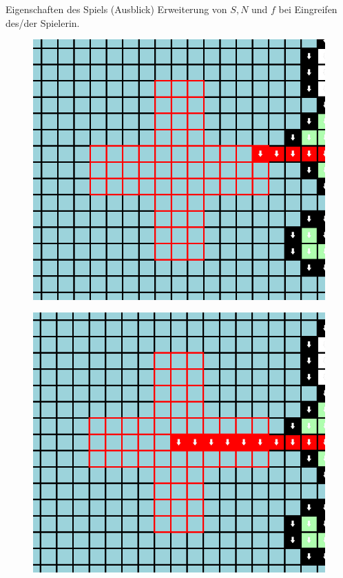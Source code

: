 \documentclass[aspectratio=169]{beamer}
\begin{document}
  \begin{frame}{Eigenschaften des Spiels (Ausblick)}
    Erweiterung von $S, N$ und $f$ bei Eingreifen des\slash der Spieler\textunderscore in.

    \vfill\null

    \begin{multicols*}{2}

      \begin{figure}[H]
        \centering
        \includegraphics[width = 0.5 \textheight]{example3n_1.png}
      \end{figure}


      \pause

      \begin{figure}[H]
        \centering
        \includegraphics[width = 0.5 \textheight]{example3n_2.png}
      \end{figure}

    \end{multicols*}

  \end{frame}
\end{document}
